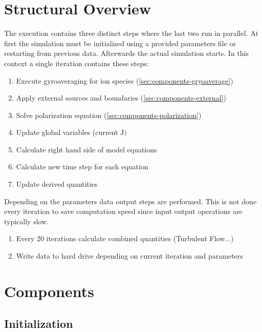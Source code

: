 \documentclass[master.tex]{subfiles}
\begin{document}
\section{Structural Overview}
The execution contains three distinct steps where the last two run in parallel. At first the simulation must be initialized using a provided parameters file or restarting from previous data. Afterwards the actual simulation starts. In this context a single iteration contains these steps:
\begin{enumerate}
    \item Execute gyroaveraging for ion species (\autoref{sec:components-gryoaverage})
    \item Apply external sources and boundaries (\autoref{sec:components-external})
    \item Solve polarization equation (\autoref{sec:components-polarization})
    \item Update global variables (current $\mathrm{J})$
    \item Calculate right hand side of model equations
    \item Calculate new time step for each equation
    \item Update derived quantities
\end{enumerate}
Depending on the parameters data output steps are performed. This is not done every iteration to save computation speed since input output operations are typically slow.
\begin{enumerate}
    \item Every 20 iterations calculate combined quantities (Turbulent Flow...)
    \item Write data to hard drive depending on current iteration and parameters
\end{enumerate}
\section{Components}
\subsection{Initialization}
\end{document}
